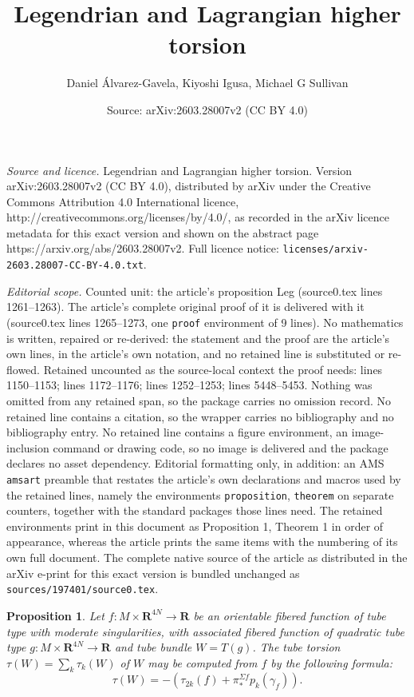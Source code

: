 \documentclass[10pt,a4paper]{amsart}
\title{Legendrian and Lagrangian higher torsion}
\author{Daniel \'Alvarez-Gavela, Kiyoshi Igusa, Michael G Sullivan}
\date{Source: arXiv:2603.28007v2 (CC BY 4.0)}
\newtheorem{proposition}{Proposition}
\def\bR{\mathbf{R}}
\begin{document}
\maketitle

\noindent\emph{Source and licence.} Legendrian and Lagrangian higher torsion. Version arXiv:2603.28007v2 (CC BY 4.0), distributed by arXiv under the Creative Commons Attribution 4.0 International licence, http://creativecommons.org/licenses/by/4.0/, as recorded in the arXiv licence metadata for this exact version and shown on the abstract page https://arxiv.org/abs/2603.28007v2. Full licence notice: \texttt{licenses/arxiv-2603.28007-CC-BY-4.0.txt}.\par\smallskip

\noindent\textit{Editorial scope.} Counted unit: the article's proposition Leg (source0.tex lines 1261--1263). The article's complete original proof of it is delivered with it (source0.tex lines 1265--1273, one \texttt{proof} environment of 9 lines). No mathematics is written, repaired or re-derived: the statement and the proof are the article's own lines, in the article's own notation, and no retained line is substituted or re-flowed.  Retained uncounted as the source-local context the proof needs: lines 1150--1153; lines 1172--1176; lines 1252--1253; lines 5448--5453.  Nothing was omitted from any retained span, so the package carries no omission record.  No retained line contains a citation, so the wrapper carries no bibliography and no bibliography entry.  No retained line contains a figure environment, an image-inclusion command or drawing code, so no image is delivered and the package declares no asset dependency.  Editorial formatting only, in addition: an AMS \texttt{amsart} preamble that restates the article's own declarations and macros used by the retained lines, namely the environments \texttt{proposition}, \texttt{theorem} on separate counters, together with the standard packages those lines need.  The retained environments print in this document as Proposition 1, Theorem 1 in order of appearance, whereas the article prints the same items with the numbering of its own full document.  The complete native source of the article as distributed in the arXiv e-print for this exact version is bundled unchanged as \texttt{sources/197401/source0.tex}.
\begin{proposition}\label{prop: stab framing}
Let $f:M \times \bR^{4N} \to \bR$ be an orientable fibered function of tube type with moderate singularities, with associated fibered function of quadratic tube type $g:M \times \bR^{4N} \to \bR$ and tube bundle $W=T(g)$. The tube torsion $\tau(W) = \sum_k \tau_k(W)$ of $W$ may be computed from $f$ by the following formula: 
$$\tau(W) =    -\left(\tau_{2k}(f)  +   \pi_*^{\Sigma f} p_k(\gamma_f)\right).$$
\end{proposition}
\end{document}
